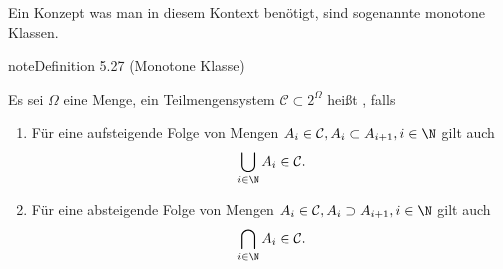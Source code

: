 \documentclass[letterpaper,10pt,german]{jupyterBook}
\begin{document}
\sphinxAtStartPar
Ein Konzept was man in diesem Kontext benötigt, sind sogenannte monotone Klassen.
\label{masstheorie/integrationstechnik:definition-13}
\begin{sphinxadmonition}{note}{Definition 5.27 (Monotone Klasse)}



\sphinxAtStartPar
Es sei \(\Omega\) eine Menge, ein Teilmengensystem \(\mathcal{C}\subset 2^\Omega\) heißt , falls
\begin{enumerate}
%
\item {} 
\sphinxAtStartPar
Für eine aufsteigende Folge von Mengen \(A_i\in\mathcal{C}, A_i\subset A_{i+1}, i\in\N\) gilt auch
\begin{equation*}
\begin{split}\bigcup_{i\in\N} A_i\in\mathcal{C}.\end{split}
\end{equation*}
\item {} 
\sphinxAtStartPar
Für eine absteigende Folge von Mengen \(A_i\in\mathcal{C}, A_i\supset A_{i+1}, i\in\N\) gilt auch
\begin{equation*}
\begin{split}\bigcap_{i\in\N} A_i\in\mathcal{C}.\end{split}
\end{equation*}
\end{enumerate}
\end{sphinxadmonition}
\end{document}
